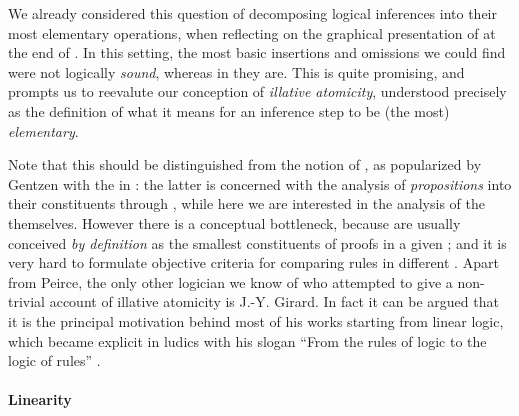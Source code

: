 \begin{scope}
\begin{scope}
We already considered this question of decomposing logical inferences into their
most elementary operations, when reflecting on the graphical presentation of
 at the end of . In this setting, the
most basic insertions and omissions we could find were not logically
\emph{sound}, whereas in  they are. This is quite promising, and
prompts us to reevalute our conception of \emph{illative atomicity}, understood
precisely as the definition of what it means for an inference step to be (the
most) \emph{elementary}.

Note that this should be distinguished from the notion of \emph{}, as
popularized by Gentzen with the \emph{} in : the latter is concerned with the analysis of \emph{propositions} into
their constituents through , while here we are interested in
the analysis of the  themselves. However there is a conceptual bottleneck, because
 are usually conceived \emph{by definition} as the smallest
constituents of proofs in a given ; and it is very hard to
formulate objective criteria for comparing rules in different . Apart from Peirce, the only other logician we know of who attempted to
give a non-trivial account of illative atomicity is J.-Y. Girard. In fact it can
be argued that it is the principal motivation behind most of his works starting
from linear logic, which became explicit in ludics with his slogan ``From the
rules of logic to the logic of rules'' \cite{girard_locus_2001}.

\paragraph{Linearity}


\end{scope}
\end{scope}
